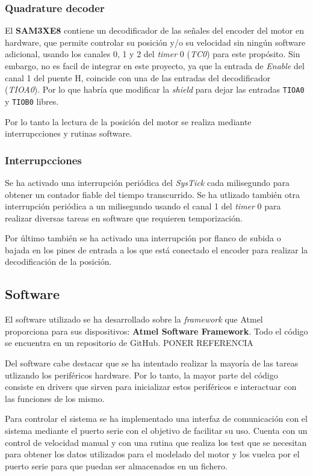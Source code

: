 \documentclass{article}
\begin{document}
\subsubsection{Quadrature decoder}
El \textbf{SAM3XE8} contiene un decodificador de las señales del encoder del motor en hardware,
que permite controlar su posición y/o su velocidad sin ningún software adicional, usando los canales 0, 1 y 2 del \emph{timer} 0 (\emph{TC0}) para este propósito.
Sin embargo, no es facil de integrar en este proyecto, ya que la entrada de \emph{Enable} del canal 1 del puente H, coincide con una de las entradas del decodificador (\emph{TIOA0}).
Por lo que habría que modificar la \emph{shield} para dejar las entradas \texttt{TIOA0} y \texttt{TIOB0} libres.

Por lo tanto la lectura de la posición del motor se realiza mediante interrupcciones y rutinas software.

\subsubsection{Interrupcciones}
Se ha activado una interrupción periódica del \emph{SysTick} cada milisegundo para obtener un contador fiable del tiempo transcurrido.
Se ha utlizado también otra interrupción periódica a un milisegundo usando el canal 1 del \emph{timer} 0 para realizar diversas tareas en software que requieren temporización.

Por último también se ha activado una interrupción por flanco de subida o bajada en los pines de entrada a los que está conectado el encoder para realizar la decodificación de la posición.

\subsection{Software}
El software utilizado se ha desarrollado sobre la \emph{framework} que Atmel proporciona para sus dispositivos: \textbf{Atmel Software Framework}.
Todo el código se encuentra en un repositorio de GitHub. PONER REFERENCIA

Del software cabe destacar que se ha intentado realizar la mayoría de las tareas utlizando los periféricos hardware. Por lo tanto,
la mayor parte del código consiste en drivers que sirven para inicializar estos periféricos e interactuar con las funciones de los mismo.

Para controlar el sistema se ha implementado una interfaz de comunicación con el sistema mediante el puerto serie con el objetivo de facilitar su uso.
Cuenta con un control de velocidad manual y con una rutina que realiza los test que se necesitan para obtener los datos utilizados para el modelado del motor y los vuelca
por el puerto serie para que puedan ser almacenados en un fichero.
\end{document}
